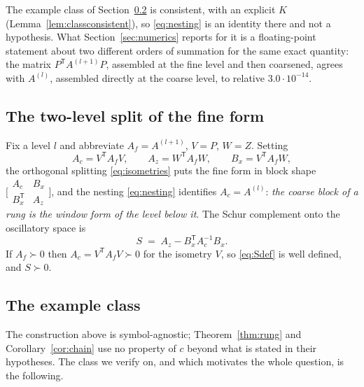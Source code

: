 \documentclass[11pt,a4paper]{article}
\theoremstyle{plain}
\theoremstyle{definition}
\newcommand{\T}{\mathsf{T}}
\newcommand{\PD}{\succ 0}
\begin{document}
The example class of Section~\ref{sec:example} is consistent, with an explicit $K$
(Lemma~\ref{lem:classconsistent}), so \eqref{eq:nesting} is an identity there and not
a hypothesis. What Section~\ref{sec:numerics} reports for it is a floating-point
statement about two different orders of summation for the same exact quantity: the
matrix $P^{\T}A^{(l+1)}P$, assembled at the fine level and then coarsened, agrees with
$A^{(l)}$, assembled directly at the coarse level, to relative $3.0\cdot10^{-14}$.

\subsection{The two-level split of the fine form}
\label{sec:split}

Fix a level $l$ and abbreviate $A_{f}=A^{(l+1)}$, $V=P$, $W=Z$. Setting
\begin{equation}
\label{eq:blocks}
  A_{c}=V^{\T}A_{f}V,\qquad
  A_{z}=W^{\T}A_{f}W,\qquad
  B_{x}=V^{\T}A_{f}W,
\end{equation}
the orthogonal splitting \eqref{eq:isometries} puts the fine form in block shape
$\bigl[\begin{smallmatrix}A_{c}&B_{x}\\ B_{x}^{\T}&A_{z}\end{smallmatrix}\bigr]$, and
the nesting \eqref{eq:nesting} identifies $A_{c}=A^{(l)}$: \emph{the coarse block of a
rung is the window form of the level below it}. The Schur complement onto the
oscillatory space is
\begin{equation}
\label{eq:Sdef}
  S \;=\; A_{z}-B_{x}^{\T}A_{c}^{-1}B_{x} .
\end{equation}
If $A_{f}\PD$ then $A_{c}=V^{\T}A_{f}V\PD$ for the isometry $V$, so \eqref{eq:Sdef}
is well defined, and $S\PD$.

\subsection{The example class}
\label{sec:example}

The construction above is symbol-agnostic; Theorem~\ref{thm:rung} and
Corollary~\ref{cor:chain} use no property of $c$ beyond what is stated in their
hypotheses. The class we verify on, and which motivates the whole question, is the
following.
\end{document}
